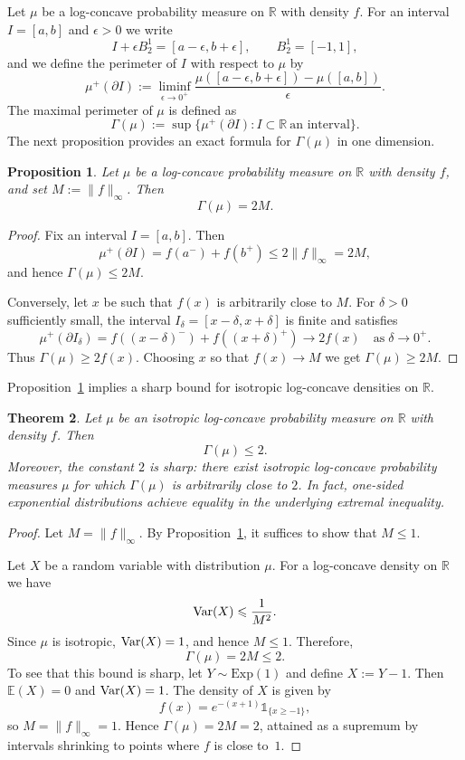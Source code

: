 \documentclass[11pt,leqno]{article}
\newtheorem{theorem}{Theorem}[section]
\newtheorem{proposition}[theorem]{Proposition}
\theoremstyle{remark}
\numberwithin{equation}{section}
\newcommand{\ls}{\leqslant}
\newcommand{\gr}{\geqslant}
\begin{document}
\medskip 

 Let $\mu$ be a log-concave probability measure on $\mathbb{R}$ with density $f$.
For an interval $I=[a,b]$ and $\epsilon>0$ we write
$$I+\epsilon B_2^1=[a-\epsilon,b+\epsilon],\qquad B_2^1=[-1,1],$$
and we define the perimeter of $I$ with respect to $\mu$ by
$$\mu^{+}(\partial I)
:=\liminf_{\epsilon\to0^+}\frac{\mu([a-\epsilon,b+\epsilon])-\mu([a,b])}{\epsilon}.$$
The maximal perimeter of $\mu$ is defined as
$$\Gamma(\mu):=\sup\big\{\mu^{+}(\partial I): I\subset\mathbb{R} \ \text{an interval}\big\}.$$
The next proposition provides an exact formula for $\Gamma(\mu)$ in one dimension.

\begin{proposition}\label{prop:Gamma_equals_2M}Let $\mu$ be a log-concave probability measure on $\mathbb{R}$ with density $f$, and set $M:=\|f\|_\infty$. Then
$$\Gamma(\mu)=2M.$$
\end{proposition}

\begin{proof}Fix an interval $I=[a,b]$. Then
$$\mu^+(\partial I)=f(a^-)+f(b^+)\ls 2\|f\|_\infty = 2M,$$
and hence $\Gamma(\mu)\ls 2M$.

Conversely, let $x$ be such that $f(x)$ is arbitrarily close to $M$. For $\delta>0$ sufficiently small, the interval 
$I_\delta=[x-\delta,x+\delta]$ is finite and satisfies
$$\mu^+(\partial I_\delta)=f((x-\delta)^-)+f((x+\delta)^+)\to 2f(x)\quad \text{as}\;\delta\to 0^+.$$
Thus $\Gamma(\mu)\gr 2f(x)$. Choosing $x$ so that $f(x)\to M$ we get $\Gamma(\mu)\gr 2M$.
\end{proof}

Proposition~\ref{prop:Gamma_equals_2M} implies a sharp bound for isotropic log-concave densities on $\mathbb{R}$.

\begin{theorem}\label{thm:1d_isotropic_sharp}
Let $\mu$ be an isotropic log-concave probability measure on $\mathbb{R}$ with density $f$. Then
$$\Gamma(\mu)\ls 2.$$
Moreover, the constant $2$ is sharp: there exist isotropic log-concave probability measures $\mu$ for which 
$\Gamma(\mu)$ is arbitrarily close to $2$. In fact, one-sided exponential distributions achieve equality in 
the underlying extremal inequality.
\end{theorem}

\begin{proof}
Let $M=\|f\|_\infty$. By Proposition~\ref{prop:Gamma_equals_2M}, it suffices to show that $M\ls 1$.
	
Let $X$ be a random variable with distribution $\mu$. For a log-concave density on $\mathbb{R}$ we have  
$${\rm Var}(X)\ls \frac{1}{M^2}.$$
Since $\mu$ is isotropic, ${\rm Var}(X)=1$, and hence $M\ls 1$. Therefore, 
$$\Gamma(\mu)=2M\ls 2.$$
To see that this bound is sharp, let $Y\sim\mathrm{Exp}(1)$ and define $X:=Y-1$. Then $\mathbb{E}(X)=0$ and ${\rm Var}(X)=1$. The
density of $X$ is given by
$$f(x)=e^{-(x+1)}\mathds{1}_{\{x\gr -1\}},$$ so $M=\|f\|_\infty=1$. Hence 
$\Gamma(\mu)=2M=2$, attained as a supremum by intervals shrinking to points where $f$ is close to~$1$.
\end{proof}
\end{document}
